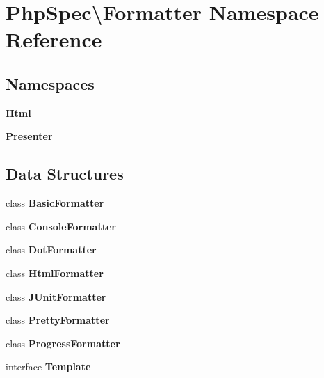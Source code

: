 \section{Php\+Spec\textbackslash{}Formatter Namespace Reference}
\label{namespace_php_spec_1_1_formatter}
\subsection*{Namespaces}
\begin{DoxyCompactItemize}
\item 
 {\bf Html}
\item 
 {\bf Presenter}
\end{DoxyCompactItemize}
\subsection*{Data Structures}
\begin{DoxyCompactItemize}
\item 
class {\bf Basic\+Formatter}
\item 
class {\bf Console\+Formatter}
\item 
class {\bf Dot\+Formatter}
\item 
class {\bf Html\+Formatter}
\item 
class {\bf J\+Unit\+Formatter}
\item 
class {\bf Pretty\+Formatter}
\item 
class {\bf Progress\+Formatter}
\item 
interface {\bf Template}
\end{DoxyCompactItemize}
